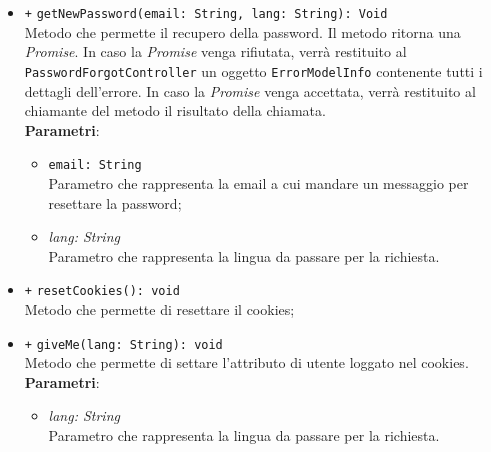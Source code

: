 \begin{itemize}
\begin{itemize}
		\item \texttt{+} \texttt{getNewPassword(email: String, lang: String): Void}  \\Metodo che permette il recupero della password. Il metodo ritorna una \textit{Promise}. In caso la \textit{Promise} venga rifiutata, verrà restituito al \texttt{PasswordForgotController} un oggetto \texttt{ErrorModelInfo} contenente tutti i dettagli dell'errore. In caso la \textit{Promise} venga accettata, verrà restituito al chiamante del metodo il risultato della chiamata. \\
			\textbf{Parametri}:
			\begin{itemize}
				\item \texttt{email: String} \\ Parametro che rappresenta la email a cui mandare un messaggio per resettare la password;
				\item \textit{lang: String} \\ Parametro che rappresenta la lingua da passare per la richiesta.
			\end{itemize}
		\item \texttt{+} \texttt{resetCookies(): void} \\ Metodo che permette di resettare il cookies;
		\item \texttt{+} \texttt{giveMe(lang: String): void} \\ Metodo che permette di settare l'attributo di utente loggato nel cookies. \\
		\textbf{Parametri}: 
		\begin{itemize}
			\item \textit{lang: String} \\ Parametro che rappresenta la lingua da passare per la richiesta.
		\end{itemize}
	\end{itemize}
\end{itemize}